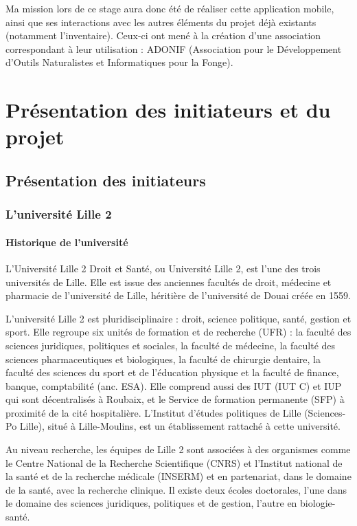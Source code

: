 \documentclass[11pt, a4paper, twoside]{report}
\begin{document}
Ma mission lors de ce stage aura donc été de réaliser cette application mobile, ainsi que ses interactions avec les autres éléments du projet déjà existants (notamment l'inventaire). Ceux-ci ont mené à la création d'une association correspondant à leur utilisation : ADONIF (Association pour le Développement d'Outils Naturalistes et Informatiques pour la Fonge). 

\chapter{Présentation des initiateurs et du projet}
\section{Présentation des initiateurs}
\subsection{L'université Lille 2}
\subsubsection{Historique de l'université}
L’Université Lille 2 Droit et Santé, ou Université Lille 2, est l'une des trois universités de Lille. Elle est issue des anciennes facultés de droit, médecine et pharmacie de l’université de Lille, héritière de l'université de Douai créée en 1559.

L'université Lille 2 est pluridisciplinaire : droit, science politique, santé, gestion et sport. Elle regroupe six unités de formation et de recherche (UFR) : la faculté des sciences juridiques, politiques et sociales, la faculté de médecine, la faculté des sciences pharmaceutiques et biologiques, la faculté de chirurgie dentaire, la faculté des sciences du sport et de l'éducation physique et la faculté de finance, banque, comptabilité (anc. ESA). Elle comprend aussi des IUT (IUT C) et IUP qui sont décentralisés à Roubaix, et le Service de formation permanente (SFP) à proximité de la cité hospitalière. L'Institut d'études politiques de Lille (Sciences-Po Lille), situé à Lille-Moulins, est un établissement rattaché à cette université.

Au niveau recherche, les équipes de Lille 2 sont associées à des organismes comme le Centre National de la Recherche Scientifique (CNRS) et l'Institut national de la santé et de la recherche médicale (INSERM) et en partenariat, dans le domaine de la santé, avec la recherche clinique. Il existe deux écoles doctorales, l'une dans le domaine des sciences juridiques, politiques et de gestion, l'autre en biologie-santé.
\end{document}
